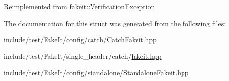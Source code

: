 Reimplemented from \mbox{\hyperlink{structfakeit_1_1VerificationException_aba8bb8f60a0427c01868a0ab0388fd0b}{fakeit\+::\+Verification\+Exception}}.



The documentation for this struct was generated from the following files\+:\begin{DoxyCompactItemize}
\item 
include/test/\+Fake\+It/config/catch/\mbox{\hyperlink{CatchFakeit_8hpp}{Catch\+Fakeit.\+hpp}}\item 
include/test/\+Fake\+It/single\+\_\+header/catch/\mbox{\hyperlink{single__header_2catch_2fakeit_8hpp}{fakeit.\+hpp}}\item 
include/test/\+Fake\+It/config/standalone/\mbox{\hyperlink{StandaloneFakeit_8hpp}{Standalone\+Fakeit.\+hpp}}\end{DoxyCompactItemize}
